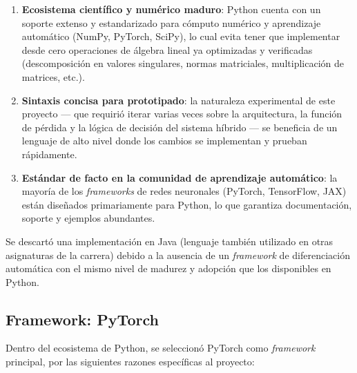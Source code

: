 \documentclass[12pt,a4paper]{article}
\begin{document}
\begin{enumerate}
    \item \textbf{Ecosistema científico y numérico maduro}: Python cuenta con un soporte extenso y estandarizado para cómputo numérico y aprendizaje automático (NumPy, PyTorch, SciPy), lo cual evita tener que implementar desde cero operaciones de álgebra lineal ya optimizadas y verificadas (descomposición en valores singulares, normas matriciales, multiplicación de matrices, etc.).

    \item \textbf{Sintaxis concisa para prototipado}: la naturaleza experimental de este proyecto --- que requirió iterar varias veces sobre la arquitectura, la función de pérdida y la lógica de decisión del sistema híbrido --- se beneficia de un lenguaje de alto nivel donde los cambios se implementan y prueban rápidamente.

    \item \textbf{Estándar de facto en la comunidad de aprendizaje automático}: la mayoría de los \textit{frameworks} de redes neuronales (PyTorch, TensorFlow, JAX) están diseñados primariamente para Python, lo que garantiza documentación, soporte y ejemplos abundantes.
\end{enumerate}

Se descartó una implementación en Java (lenguaje también utilizado en otras asignaturas de la carrera) debido a la ausencia de un \textit{framework} de diferenciación automática con el mismo nivel de madurez y adopción que los disponibles en Python.

\subsection{Framework: PyTorch}

Dentro del ecosistema de Python, se seleccionó PyTorch como \textit{framework} principal, por las siguientes razones específicas al proyecto:
\end{document}
